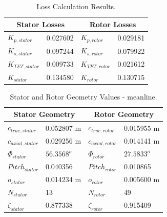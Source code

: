 \documentclass[12pt, letter]{report}
\begin{document}
\begin{table}[H]
    \caption{Loss Calculation Results.}
    \label{tab:loss_calcs}
    \centering
    \begin{tabular}[H]{l l l l}
    \toprule[1pt]
    \multicolumn{2}{c}{\textbf{Stator Losses}}    & \multicolumn{2}{c}{\textbf{Rotor Losses}}          \\
    \midrule
    $K_{p, stator}$     & 0.027602              &   $K_{p, rotor}$                          &  0.029181  \\
    $K_{s, stator}$    &  0.097244 & $K_{s, rotor}$ & 0.079922 \\
    $K_{TET, stator}$   &  0.009733 & $K_{TET, rotor}$  & 0.021612 \\
    $K_{stator}$   &  0.134580 & $K_{rotor}$  & 0.130715 \\
    \midrule

    \end{tabular}
\end{table}

\begin{table}[H]
    \caption{Stator and Rotor Geometry Values - meanline.}
    \label{tab:blade_geom}
    \centering
    \begin{tabular}[H]{l l l l}
    \toprule[1pt]
    \multicolumn{2}{c}{\textbf{Stator Geometry}}    & \multicolumn{2}{c}{\textbf{Rotor Geometry}}          \\
    \midrule
    $c_{true,stator}$     & 0.052807 m             &   $c_{true,rotor}$                          &  0.015955 m  \\
    $c_{axial,stator}$    &  0.029256 m & $c_{axial,rotor}$ & 0.014141 m \\
    $\Phi_{stator}$   &  $56.3568^o$ & $\Phi_{rotor}$  & $27.5833^o$ \\
    $Pitch_{stator}$   &  0.040356 & $Pitch_{rotor}$  & 0.010865 \\
    $o_{stator}$   &  0.014234 m & $o_{rotor}$  & 0.005600 m \\
    $N_{stator}$   &  13 & $N_{rotor}$  & 49 \\
    $\zeta_{stator}$   &  0.877338 & $\zeta_{rotor}$  & 0.915409 \\
    \midrule

    \end{tabular}
\end{table}
\end{document}
